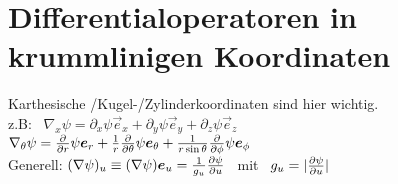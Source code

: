 \section{Differentialoperatoren in krummlinigen Koordinaten}
Karthesische /Kugel-/Zylinderkoordinaten sind hier wichtig.\\
\linebreak
z.B: \ $\nabla_x\psi=\partial_x\psi\vec{e}_x+\partial_y\psi\vec{e}_y+\partial_z\psi\vec{e}_z$\\
\linebreak
$\nabla_\theta\psi=\frac{\partial{}}{\partial{r}}\psi\bm{e}_r+\frac{1}{r}\frac{\partial{}}{\partial{\theta}}\psi\bm{e}_\theta+\frac{1}{r\sin\theta}\frac{\partial{}}{\partial{\phi}}\psi\bm{e}_\phi$\\
\linebreak
Generell: $(\nabla\psi)_u\equiv(\nabla\psi)\bm{e}_u=\frac{1}{g_u}\frac{\partial{\psi}}{\partial{u}}$ \ mit \ $g_u=|\frac{\partial{\psi}}{\partial{u}}|$\\
